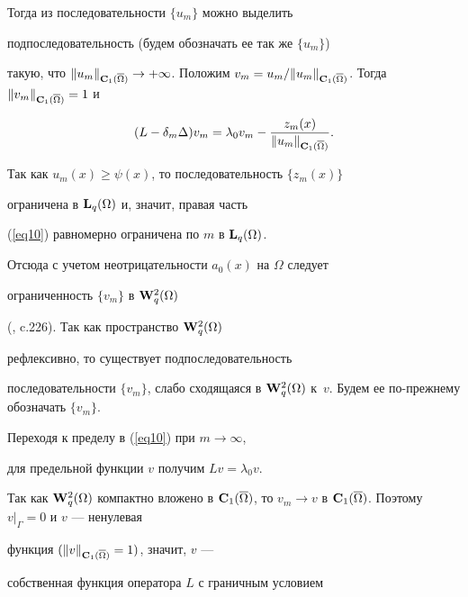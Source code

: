 Тогда из последовательности $\{u_m\}$ можно выделить


подпоследовательность  (будем обозначать ее так же $\{u_m\}$)


такую, что $\|u_m\|_{{\bold C}_1({\overline{\Omega}})}\to


+\infty$. Положим $v_m={u_m}/{\|u_m\|_{{\bold


C}_1({\overline\Omega})}}$. Тогда $\|v_m\|_{{\bold


C}_1({\overline{\Omega}})}=1$ и


\begin{equation}\label{eq10}


(L-\delta_m\Delta)v_m=\lambda_0v_m-


\frac{z_m(x)}{\|u_m\|_{{\bold C}_1({\overline{\Omega}})}}.


\end{equation}





Так как $u_m(x)\ge\psi(x)$, то последовательность $\{z_m(x)\}$


ограничена в ${\bold L}_q(\Omega)$ и, значит, правая часть


(\ref{eq10}) равномерно ограничена по $m$ в ${\bold L}_q(\Omega)$.


Отсюда с учетом неотрицательности $a_0(x)$ на $\Omega$ следует


ограниченность $\{v_m\}$ в ${\bold W}_q^2(\Omega)$


(\cite{Gil}, c.226). Так как пространство ${\bold W}_q^2(\Omega)$


рефлексивно, то существует подпоследовательность


последовательности $\{v_m\}$, слабо сходящаяся в ${\bold


W}_q^2(\Omega)$ к~$v$. Будем ее по-прежнему обозначать $\{v_m\}$.


Переходя к пределу в (\ref{eq10}) при $m\to\infty$, 


для предельной функции $v$ получим $Lv=\lambda_0v$.


Так как ${\bold W}_q^2(\Omega)$ компактно вложено в ${\bold


C}_1(\overline{\Omega})$, то $v_m\to v$ в ${\bold


C}_1(\overline{\Omega})$. Поэтому $v |_{\Gamma}=0$ и $v$ --- ненулевая


функция $(\|v\|_{{\bold C}_1(\overline{\Omega})}=1)$, значит, $v$ ---


собственная функция оператора $L$ с граничным условием


